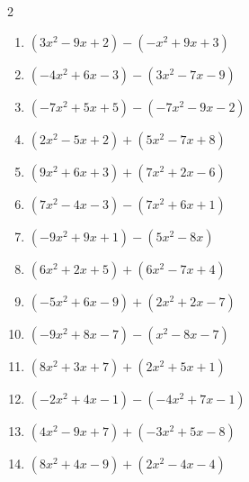 \begin{multicols}{2}
\begin{enumerate}
  \item $(3x^{2}-9x+2)-(-x^{2}+9x+3)$


  \item $(-4x^{2}+6x-3)-(3x^{2}-7x-9)$


  \item $(-7x^{2}+5x+5)-(-7x^{2}-9x-2)$

        \phantom{$=14x+7$}

  \item $(2x^{2}-5x+2)+(5x^{2}-7x+8)$


  \item $(9x^{2}+6x+3)+(7x^{2}+2x-6)$


  \item $(7x^{2}-4x-3)-(7x^{2}+6x+1)$

        \phantom{$=-10x-4$}

  \item $(-9x^{2}+9x+1)-(5x^{2}-8x)$


  \item $(6x^{2}+2x+5)+(6x^{2}-7x+4)$


  \item $(-5x^{2}+6x-9)+(2x^{2}+2x-7)$


  \item $(-9x^{2}+8x-7)-(x^{2}-8x-7)$


  \item $(8x^{2}+3x+7)+(2x^{2}+5x+1)$


  \item $(-2x^{2}+4x-1)-(-4x^{2}+7x-1)$


  \item $(4x^{2}-9x+7)+(-3x^{2}+5x-8)$


  \item $(8x^{2}+4x-9)+(2x^{2}-4x-4)$


\end{enumerate}
\end{multicols}
